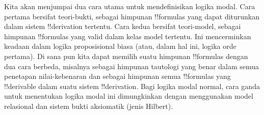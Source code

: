 \documentclass[../../../include/open-logic-section]{subfiles}
\begin{document}
Kita akan menjumpai dua cara utama untuk mendefinisikan logika modal. Cara
pertama bersifat teori-bukti, sebagai himpunan !!{formula}s yang dapat
diturunkan dalam sistem !!{derivation} tertentu. Cara kedua bersifat
teori-model, sebagai himpunan !!{formula}s yang valid dalam kelas model
tertentu. Ini mencerminkan keadaan dalam logika proposisional biasa (atau,
dalam hal ini, logika orde pertama). Di sana pun kita dapat memilih suatu
himpunan !!{formula}s dengan dua cara berbeda, misalnya sebagai himpunan
tautologi yang benar dalam semua penetapan nilai-kebenaran dan sebagai
himpunan semua !!{formula}s yang !!{derivable} dalam suatu sistem
!!{derivation}. Bagi logika modal normal, cara ganda untuk menentukan logika
modal ini dimungkinkan dengan menggunakan model relasional dan sistem bukti
aksiomatik (jenis Hilbert).
\end{document}
